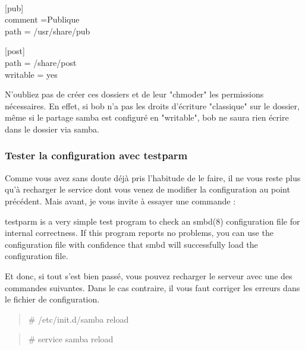 \documentclass[a4paper,11pt]{article}
\newcommand{\commande}[1] {
    \begin{quote}
    \tt\raggedright #1
    \end{quote}
}
\newcommand{\man}[2]{
    \begin{tcolorbox}[toprule=3mm,width=\textwidth,outer arc=0mm,colbacktitle=grayman,coltitle=black,colback={grayman},colframe={grayman},title={man : \tt #1}]
        \tt\raggedright #2
    \end{tcolorbox}
}
\newcommand{\demi}[1]{
\begin{minipage}[t]{0.45\textwidth}
    \tt\raggedright
    #1
\end{minipage}
}
\begin{document}
\\
\demi{
[pub]\\
comment =Publique\\
path = /usr/share/pub
}
\demi{
[post]\\
path = /share/post\\
writable = yes
}
\par N'oubliez pas de créer ces dossiers et de leur "chmoder" les permissions nécessaires. En effet, si bob n'a pas les droits d'écriture "classique" sur le dossier, même si le partage samba est configuré en "writable", bob ne saura rien écrire dans le dossier via samba.

\subsubsection{Tester la configuration avec testparm}
\par Comme vous avez sans doute déjà pris l'habitude de le faire, il ne vous reste plus qu'à recharger le service dont vous venez de modifier la configuration au point précédent. Mais avant, je vous invite à essayer une commande :
\man{testparm}{testparm is a very simple test program to check an smbd(8) configuration file for internal correctness. If this program reports no problems, you can use the configuration file with confidence that smbd will successfully load the configuration file.}
\par Et donc, si tout s’est bien passé, vous pouvez recharger le serveur avec une des commandes suivantes. Dans le cas contraire, il vous faut corriger les erreurs dans le fichier de configuration.
\commande{\# /etc/init.d/samba reload}
\commande{\# service samba reload}
\end{document}
